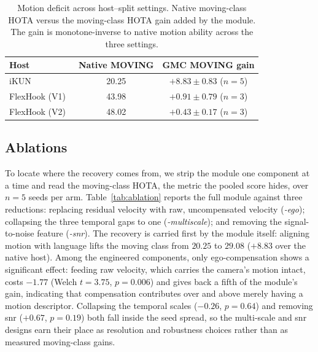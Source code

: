 \documentclass[sigconf,review,anonymous]{acmart}
\begin{document}
\begin{table}[t]
\centering
\caption{Motion deficit across host--split settings. Native moving-class HOTA versus the moving-class HOTA gain added by the module. The gain is monotone-inverse to native motion ability across the three settings.}
\label{tab:deficit}
\small
\begin{tabular}{lcc}
\toprule
Host & Native MOVING & GMC MOVING gain \\
\midrule
iKUN~\cite{ikun}             & 20.25 & $+8.83 \pm 0.83$ ($n{=}5$) \\
FlexHook (V1)~\cite{flexhook}  & 43.98 & $+0.91 \pm 0.79$ ($n{=}3$) \\
FlexHook (V2)~\cite{flexhook}  & 48.02 & $+0.43 \pm 0.17$ ($n{=}3$) \\
\bottomrule
\end{tabular}
\end{table}

\subsection{Ablations}
\label{sec:ablation}

To locate where the recovery comes from, we strip the module one component at a time and read the moving-class HOTA, the metric the pooled score hides, over $n{=}5$ seeds per arm. Table~\ref{tab:ablation} reports the full module against three reductions: replacing residual velocity with raw, uncompensated velocity (\emph{-ego}); collapsing the three temporal gaps to one (\emph{-multiscale}); and removing the signal-to-noise feature (\emph{-snr}). The recovery is carried first by the module itself: aligning motion with language lifts the moving class from $20.25$ to $29.08$ ($+8.83$ over the native host). Among the engineered components, only ego-compensation shows a significant effect: feeding raw velocity, which carries the camera's motion intact, costs $-1.77$ (Welch $t{=}3.75$, $p{=}0.006$) and gives back a fifth of the module's gain, indicating that compensation contributes over and above merely having a motion descriptor. Collapsing the temporal scales ($-0.26$, $p{=}0.64$) and removing snr ($+0.67$, $p{=}0.19$) both fall inside the seed spread, so the multi-scale and snr designs earn their place as resolution and robustness choices rather than as measured moving-class gains.
\end{document}
